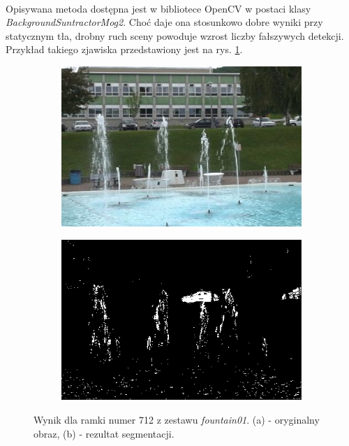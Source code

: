 \paragraph{}
Opisywana metoda dostępna jest w bibliotece OpenCV w postaci klasy \textit{BackgroundSuntractorMog2}. Choć daje ona stosunkowo dobre wyniki przy statycznym tła, drobny ruch sceny powoduje wzrost liczby fałszywych detekcji. Przykład takiego zjawiska przedstawiony jest na rys. \ref{fig:GMM}.

\begin{figure}[!h]
\centering
\begin{subfigure}[b]{0.4\textwidth}
\includegraphics[width=\textwidth]{img/GMMIn}
\caption{}
\end{subfigure}
\quad
\begin{subfigure}[b]{0.4\textwidth}
\includegraphics[width=\textwidth]{img/GMMOut}
\caption{}
\end{subfigure}
\caption{Wynik dla ramki numer 712 z zestawu \textit{fountain01}. (a) - oryginalny obraz, (b) - rezultat segmentacji.\label{fig:GMM}}
\end{figure}



